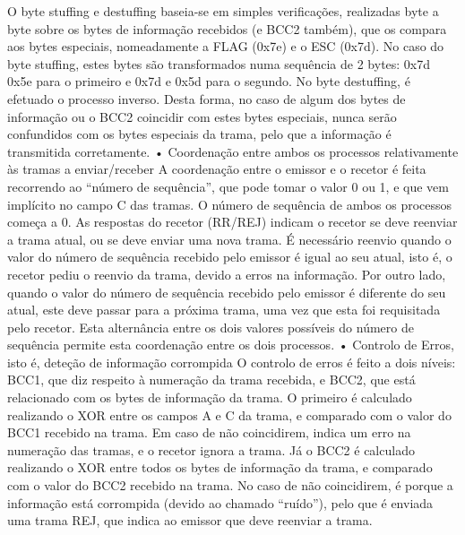 \documentclass[article, a4paper, 11pt, oneside]{memoir}
\begin{document}
O byte stuffing e destuffing baseia-se em simples verificações, realizadas byte a byte sobre os bytes de informação recebidos (e BCC2 também), que os compara aos bytes especiais, nomeadamente a FLAG (0x7e) e o ESC (0x7d). No caso do byte stuffing, estes bytes são transformados numa sequência de 2 bytes: 0x7d 0x5e para o primeiro e 0x7d e 0x5d para o segundo. No byte destuffing, é efetuado o processo inverso.
Desta forma, no caso de algum dos bytes de informação ou o BCC2 coincidir com estes bytes especiais, nunca serão confundidos com os bytes especiais da trama, pelo que a informação é transmitida corretamente.
•	Coordenação entre ambos os processos relativamente às tramas a enviar/receber
A coordenação entre o emissor e o recetor é feita recorrendo ao “número de sequência”, que pode tomar o valor 0 ou 1, e que vem implícito no campo C das tramas. O número de sequência de ambos os processos começa a 0. As respostas do recetor (RR/REJ) indicam o recetor se deve reenviar a trama atual, ou se deve enviar uma nova trama. É necessário reenvio quando o valor do número de sequência recebido pelo emissor é igual ao seu atual, isto é, o recetor pediu o reenvio da trama, devido a erros na informação. Por outro lado, quando o valor do número de sequência recebido pelo emissor é diferente do seu atual, este deve passar para a próxima trama, uma vez que esta foi requisitada pelo recetor. Esta alternância entre os dois valores possíveis do número de sequência permite esta coordenação entre os dois processos.
•	Controlo de Erros, isto é, deteção de informação corrompida
O controlo de erros é feito a dois níveis: BCC1, que diz respeito à numeração da trama recebida, e BCC2, que está relacionado com os bytes de informação da trama. O primeiro é calculado realizando o XOR entre os campos A e C da trama, e comparado com o valor do BCC1 recebido na trama. Em caso de não coincidirem, indica um erro na numeração das tramas, e o recetor ignora a trama. Já o BCC2 é calculado realizando o XOR entre todos os bytes de informação da trama, e comparado com o valor do BCC2 recebido na trama. No caso de não coincidirem, é porque a informação está corrompida (devido ao chamado “ruído”), pelo que é enviada uma trama REJ, que indica ao emissor que deve reenviar a trama.
\end{document}
